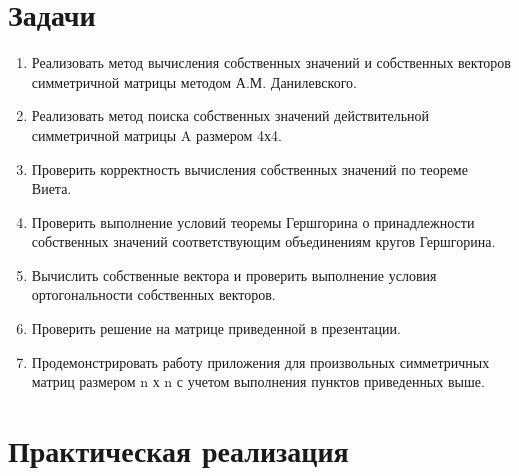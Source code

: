 \documentclass[a4paper, 14pt]{extarticle}
\begin{document}
\section{Задачи}\label{Sect::task}
\par
\renewcommand{\labelenumii}{\arabic{enumi}.\arabic{enumii}.}
\begin{enumerate} 
    \item Реализовать метод вычисления собственных значений и собственных векторов симметричной матрицы методом А.М. Данилевского.
    \item Реализовать метод поиска собственных значений действительной симметричной матрицы A размером 4х4.
    \item Проверить корректность вычисления собственных значений по теореме Виета.
    \item Проверить выполнение условий теоремы Гершгорина о принадлежности собственных значений соответствующим объединениям кругов Гершгорина.
    \item Вычислить собственные вектора и проверить выполнение условия ортогональности собственных векторов.
    \item Проверить решение на матрице приведенной в презентации.
    \item Продемонстрировать работу приложения для произвольных симметричных матриц размером n х n с учетом выполнения пунктов приведенных выше.
\end{enumerate}

\pagebreak
\section{Практическая реализация}
\par
\end{document}
